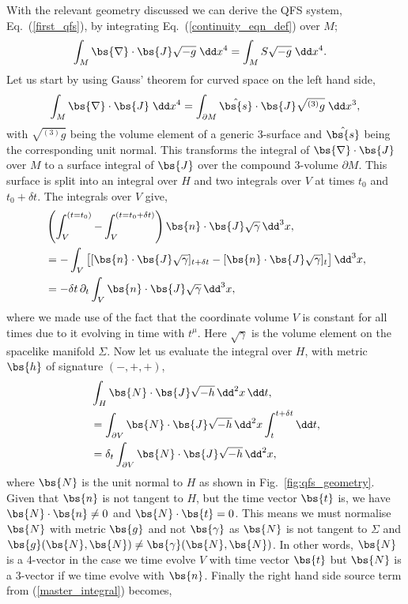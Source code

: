 With the relevant geometry discussed we can derive the QFS system, Eq.~(\ref{first_qfs}), by integrating Eq.~(\ref{continuity_eqn_def}) over $M$;
\begin{align} \label{master_integral}
\int_{M } \bs{\nabla}\cdot \bs{J} \sqrt{-g} \;\dd x^4 &= \int_{M } S \sqrt{-g} \;\dd x^4.
\end{align}
Let us start by using Gauss' theorem for curved space \cite{baumgarte_shapiro_2010} on the left hand side, 
\begin{align} \label{master_gauss}
\int_{M } \bs{\nabla}\cdot \bs{J} \;\dd x^4  = \int_{\partial M } \hat{\bs{s}} \cdot \bs{J} \sqrt{{}^{(3)}{g}} \;\dd x^3 ,
\end{align}
with $\sqrt{{}^{(3)}g}$ being the volume element of a generic 3-surface and $\hat{\bs{s}}$ being the corresponding unit normal. This transforms the integral of  $\bs{\nabla} \cdot \bs{J}$ over $M$ to a surface integral of $\bs{J}$ over the compound 3-volume $\partial M$. This surface is split into an integral over $H$ and two integrals over $V$ at times $t_0$ and $t_0 + \delta t$. The integrals over $V$ give,
\begin{align}
&\left(\int^{(t=t_0)}_{V} - \int^{(t=t_0+\delta t)}_{V} \right)\bs{n} \cdot \bs{J} \sqrt{\gamma} \,\dd^3 x ,\nonumber \\
&=-\int_{V}\big[[\bs{n} \cdot \bs{J} \sqrt{\gamma}]_{t+\delta t} - [\bs{n} \cdot \bs{J} \sqrt{\gamma}]_{t}\big] \,\dd^3 x, \\
\label{q_int}&=-\delta t\,\partial_t \int_{V} \bs{n} \cdot \bs{J} \sqrt{\gamma}\,\dd^3 x ,
\end{align} 
where we made use of the fact that the coordinate volume $V$ is constant for all times due to it evolving in time with $t^\mu$. Here $\sqrt{\gamma}$ is the volume element on the spacelike manifold $\Sigma$. Now let us evaluate the integral over $H$, with metric $\bs{h}$ of signature $(-,+,+)$,
\begin{align} 
&\int_{H} \bs{N} \cdot \bs{J} \sqrt{-h} \,\dd^2 x\,\dd t, \nonumber \\
&=\int_{\partial V}  \bs{N} \cdot \bs{J} \sqrt{-h} \,\dd^2 x\int_t^{t+\delta t}\dd t, \\
\label{f_int}&=\delta_t \int_{\partial V} \bs{N} \cdot \bs{J} \sqrt{-h} \,\dd^2 x,
\end{align}
where $\bs{N}$ is the unit normal to $H$ as shown in Fig.~\ref{fig:qfs_geometry}. Given that $\bs{n}$ is not tangent to $H$, but the time vector $\bs{t}$ is, we have $\bs{N} \cdot \bs{n} \neq 0$ and $\bs{N} \cdot \bs{t} =0$. This means we must normalise $\bs{N}$ with metric $\bs{g}$ and not $\bs{\gamma}$ as $\bs{N}$ is not tangent to $\Sigma$ and $\bs{g}(\bs{N},\bs{N})\neq \bs{\gamma}(\bs{N},\bs{N})$. In other words, $\bs{N}$ is a 4-vector in the case we time evolve $V$ with time vector $\bs{t}$ but $\bs{N}$ is a 3-vector if we time evolve with $\bs{n}$. Finally the right hand side source term from (\ref{master_integral}) becomes,
